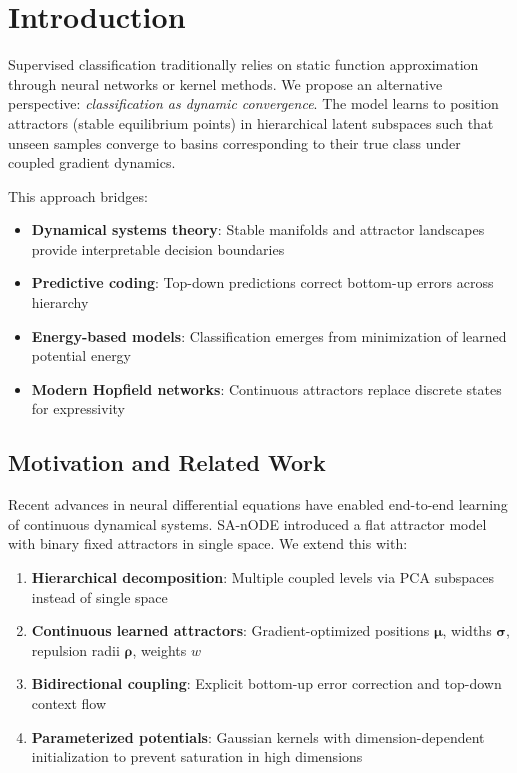\documentclass[11pt,a4paper]{article}
\begin{document}
\section{Introduction}

Supervised classification traditionally relies on static function approximation through neural networks or kernel methods. We propose an alternative perspective: \emph{classification as dynamic convergence}. The model learns to position attractors (stable equilibrium points) in hierarchical latent subspaces such that unseen samples converge to basins corresponding to their true class under coupled gradient dynamics.

This approach bridges:
\begin{itemize}
  \item \textbf{Dynamical systems theory}: Stable manifolds and attractor landscapes provide interpretable decision boundaries
  \item \textbf{Predictive coding}: Top-down predictions correct bottom-up errors across hierarchy
  \item \textbf{Energy-based models}: Classification emerges from minimization of learned potential energy
  \item \textbf{Modern Hopfield networks}: Continuous attractors replace discrete states for expressivity
\end{itemize}

\subsection{Motivation and Related Work}

Recent advances in neural differential equations \citep{chen2018neural} have enabled end-to-end learning of continuous dynamical systems. SA-nODE \citep{marino2024} introduced a flat attractor model with binary fixed attractors in single space. We extend this with:
\begin{enumerate}
  \item \textbf{Hierarchical decomposition}: Multiple coupled levels via PCA subspaces instead of single space
  \item \textbf{Continuous learned attractors}: Gradient-optimized positions $\boldsymbol{\mu}$, widths $\boldsymbol{\sigma}$, repulsion radii $\boldsymbol{\rho}$, weights $w$
  \item \textbf{Bidirectional coupling}: Explicit bottom-up error correction and top-down context flow
  \item \textbf{Parameterized potentials}: Gaussian kernels with dimension-dependent initialization to prevent saturation in high dimensions
\end{enumerate}
\end{document}
